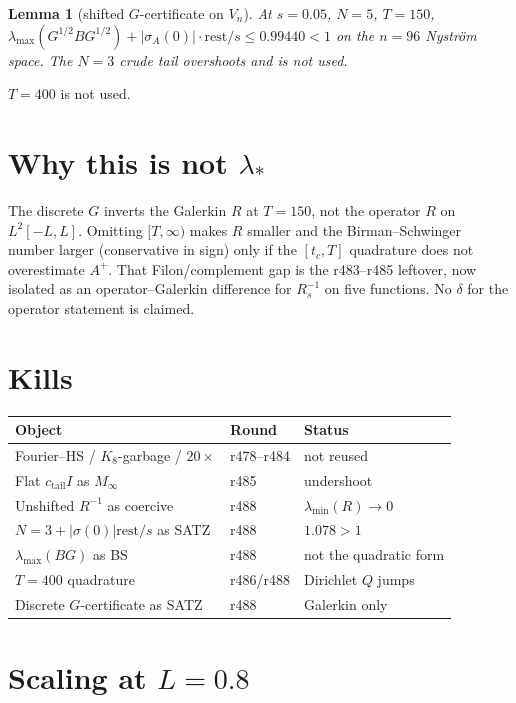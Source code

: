 \documentclass[11pt]{article}
\newtheorem{lemma}{Lemma}
\theoremstyle{remark}
\begin{document}
\begin{lemma}[shifted $G$-certificate on $V_n$]
At $s=0.05$, $N=5$, $T=150$,
$\lambda_{\max}(G^{1/2}BG^{1/2})+\lvert\sigma_A(0)\rvert\cdot\mathrm{rest}/s
\le0.99440<1$
on the $n=96$ Nystr\"om space.
The $N=3$ crude tail overshoots and is not used.
\end{lemma}

$T=400$ is not used.

\section{Why this is not $\lambda_*$}

The discrete $G$ inverts the Galerkin $R$ at $T=150$,
not the operator $R$ on $L^2[-L,L]$.
Omitting $[T,\infty)$ makes $R$ smaller and the
Birman--Schwinger number larger (conservative in
sign) only if the $[t_c,T]$ quadrature does not
overestimate $A^+$.
That Filon/complement gap is the r483--r485 leftover,
now isolated as an operator--Galerkin difference
for $R_s^{-1}$ on five functions.
No $\delta$ for the operator statement is claimed.

\section{Kills}

\begin{center}
\small
\begin{tabular}{@{}lll@{}}
\toprule
Object & Round & Status \\
\midrule
Fourier--HS / $K_8$-garbage / $20\times$
  & r478--r484 & not reused \\
Flat $c_{\mathrm{tail}}I$ as $M_\infty$ & r485 & undershoot \\
Unshifted $R^{-1}$ as coercive & r488 & $\lambda_{\min}(R)\to0$ \\
$N=3+|\sigma(0)|\mathrm{rest}/s$ as SATZ & r488 & $1.078>1$ \\
$\lambda_{\max}(BG)$ as BS & r488 & not the quadratic form \\
$T=400$ quadrature & r486/r488 & Dirichlet $Q$ jumps \\
Discrete $G$-certificate as SATZ & r488 & Galerkin only \\
\bottomrule
\end{tabular}
\end{center}

\section{Scaling at $L=0.8$}
\end{document}
